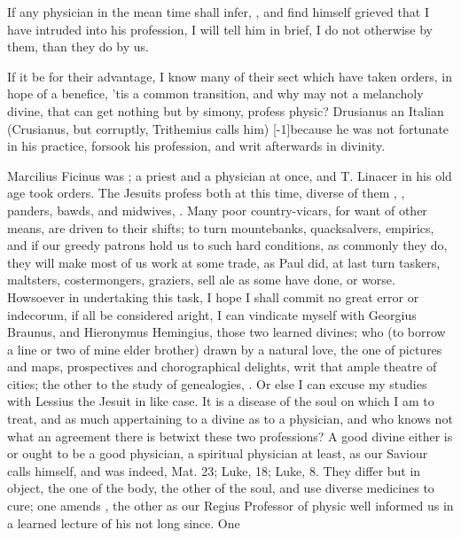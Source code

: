 {If any physician in the mean time shall infer, ,
and find himself grieved that I have intruded into his profession, I
will tell him in brief, I do not otherwise by them, than they do by us.

If it be for their advantage, I know many of their sect which have
taken orders, in hope of a benefice, 'tis a common transition, and why
may not a melancholy divine, that can get nothing but by simony,
profess physic? Drusianus an Italian (Crusianus, but corruptly,
Trithemius calls him) [-1\baselineskip]because he was not fortunate in his
practice, forsook his profession, and writ afterwards in divinity.

Marcilius Ficinus was ; a priest and a physician at once,
and T. Linacer in his old age took orders. The Jesuits profess
both at this time, diverse of them , ,
panders, bawds, and midwives, \etc. Many poor country-vicars, for want of
other means, are driven to their shifts; to turn mountebanks,
quacksalvers, empirics, and if our greedy patrons hold us to such hard
conditions, as commonly they do, they will make most of us work at some
trade, as Paul did, at last turn taskers, maltsters, costermongers,
graziers, sell ale as some have done, or worse. Howsoever in
undertaking this task, I hope I shall commit no great error or
indecorum, if all be considered aright, I can vindicate myself with
Georgius Braunus, and Hieronymus Hemingius, those two learned divines;
who (to borrow a line or two of mine elder brother) drawn by a
natural love, the one of pictures and maps, prospectives and
chorographical delights, writ that ample theatre of cities; the other
to the study of genealogies, . Or else I
can excuse my studies with Lessius the Jesuit in like case. It is
a disease of the soul on which I am to treat, and as much appertaining
to a divine as to a physician, and who knows not what an agreement
there is betwixt these two professions? A good divine either is or
ought to be a good physician, a spiritual physician at least, as our
Saviour calls himself, and was indeed, Mat.  23; Luke,  18; Luke,
 8. They differ but in object, the one of the body, the other of
the soul, and use diverse medicines to cure; one amends , the other  as our Regius Professor of
physic well informed us in a learned lecture of his not long since. One
}
